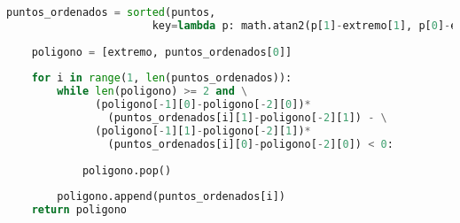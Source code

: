 \begin{enumerate}
\begin{lstlisting}[language = python]
    puntos_ordenados = sorted(puntos, 
                       key=lambda p: math.atan2(p[1]-extremo[1], p[0]-extremo[0]))
    
    poligono = [extremo, puntos_ordenados[0]]
    
    for i in range(1, len(puntos_ordenados)):
        while len(poligono) >= 2 and \
              (poligono[-1][0]-poligono[-2][0])*
                (puntos_ordenados[i][1]-poligono[-2][1]) - \
              (poligono[-1][1]-poligono[-2][1])*
                (puntos_ordenados[i][0]-poligono[-2][0]) < 0:
            
            poligono.pop()
        
        poligono.append(puntos_ordenados[i])
    return poligono


  \end{lstlisting}
\end{enumerate}
